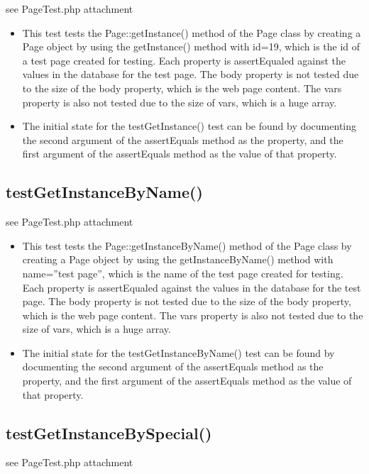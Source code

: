 \documentclass[12pt]{article}
\begin{document}
see PageTest.php attachment 

\begin{itemize}
    \item This test tests the Page::getInstance() method of the Page class by creating a Page object by using the getInstance() method with  id=19, which is the id of a test page created for testing. Each property is assertEqualed against the values in the database for the test page. The body property is not tested due to the size of the body property, which is the web page content. The vars property is also not tested due to the size of vars, which is a huge array.
    \item The initial state for the testGetInstance() test can be found by documenting the second argument of the assertEquals method as the property, and the first argument of the assertEquals method as the value of that property. 
\end{itemize}
    
    
\subsection{testGetInstanceByName()}

see PageTest.php attachment 

\begin{itemize}
\item This test tests the Page::getInstanceByName() method of the Page class by creating a Page object by using the getInstanceByName() method with name=”test page”, which is the name of the test page created for testing. Each property is assertEqualed against the values in the database for the test page. The body property is not tested due to the size of the body property, which is the web page content. The vars property is also not tested due to the size of vars, which is a huge array.
\item The initial state for the testGetInstanceByName() test can be found by documenting the second argument of the assertEquals method as the property, and the first argument of the assertEquals method as the value of that property. 
\end{itemize}

\subsection{testGetInstanceBySpecial()}

see PageTest.php attachment
\end{document}
